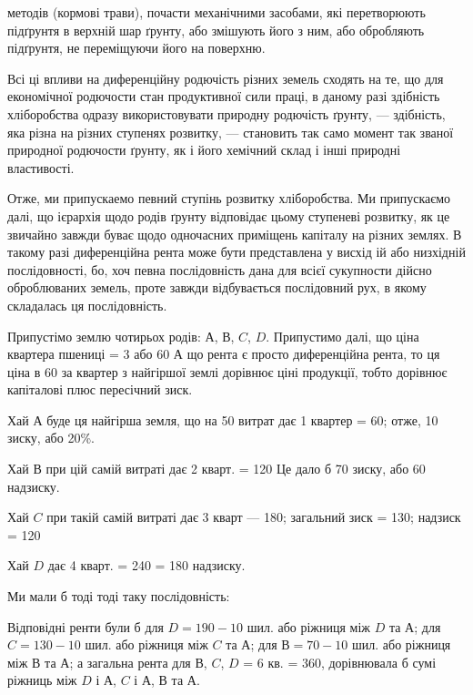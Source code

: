\parcont{}  %
методів (кормові трави), почасти механічними засобами, які перетворюють
підґрунтя в верхній шар ґрунту, або змішують його з ним, або обробляють підґрунтя,
не переміщуючи його на поверхню.

Всі ці впливи на диференційну родючість різних земель сходять на те, що для
економічної родючости стан продуктивної сили праці, в даному разі здібність хліборобства
одразу використовувати природну родючість ґрунту, — здібність, яка різна
на різних ступенях розвитку, — становить так само момент так званої природної
родючости ґрунту, як і його хемічний склад і інші природні властивості.

Отже, ми припускаемо певний ступінь розвитку хліборобства. Ми припускаємо
далі, що ієрархія щодо родів ґрунту відповідає цьому ступеневі розвитку,
як це звичайно завжди буває щодо одночасних приміщень капіталу на різних
землях. В такому разі диференційна рента може бути представлена у висхід ій
або низхідній послідовності, бо, хоч певна послідовність дана для всієї сукупности
дійсно оброблюваних земель, проте завжди відбувається послідовний рух,
в якому складалась ця послідовність.

Припустімо землю чотирьох родів: $А$, $В$, $C$, $D$. Припустимо далі, що ціна
квартера пшениці = 3 або 60 А що рента є просто диференційна рента,
то ця ціна в 60 за квартер з найгіршої землі дорівнює ціні продукції,
тобто дорівнює капіталові плюс пересічний зиск.

Хай $А$ буде ця найгірша земля, що на 50 витрат дає 1 квартер = 60; отже, 10 зиску, або 20\%.

Хай $В$ при цій самій витраті дає 2 кварт. = 120 Це дало б 70
зиску, або 60 надзиску.

Хай $C$ при такій самій витраті дає 3 кварт — 180; загальний
зиск = 130; надзиск = 120

Хай $D$ дає 4 кварт. = 240 = 180 надзиску.

Ми мали б тоді тоді таку послідовність:

Відповідні ренти були б для $D = 190 - 10$ шил. або ріжниця між $D$ та
$А$; для $C = 130 - 10$ шил. або ріжниця між $C$ та $А$; для $В = 70 - 10$ шил. або ріжниця
між $В$ та $А$; а загальна рента для $В$, $C$, $D$ = 6 кв. = 360, дорівнювала б сумі ріжниць між
$D$ і $А$, $C$ і $А$, $В$ та $А$.

